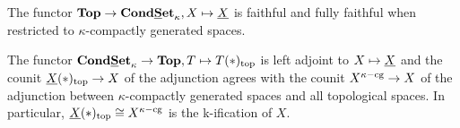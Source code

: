 \begin{proposition}
	\label{proposition: adjointness and faithfulness}
	
	The functor ${{\mathbf{Top}}}\to{{{\mathbf{Cond}}}{{\mathbf{\underline{S}et}}}_{\kappa}}, X\mapsto\underline{X}$ is faithful and fully faithful when restricted to $\kappa$-compactly generated spaces.
	
	The functor ${{{\mathbf{Cond}}}{{\mathbf{\underline{S}et}}}_{\kappa}} \to {{\mathbf{Top}}}, T\mapsto {T(\ast)_\mathrm{top}}$ is left adjoint to $X\mapsto \underline{X}$ and the counit ${\underline{X}(\ast)_\mathrm{top}}\to X$ of the adjunction agrees with the counit $X^{\kappa\mathrm{-cg}}\to X$ of the adjunction between $\kappa$-compactly generated spaces and all topological spaces. In particular, ${\underline{X}(\ast)_\mathrm{top}}\cong X^{\kappa\mathrm{-cg}}$ is the k-ification of $X$.
\end{proposition}
